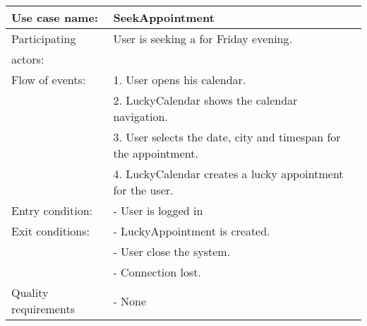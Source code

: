 {\tabulinesep=1.2mm
\begin{tabu}{ | p{3cm} | p{13cm} |}
    \hline
    Use case name: 			& 		SeekAppointment\\ \hline
    Participating  			& 		User is seeking a for Friday evening. \\
    actors:					&		\\ \hline
    Flow of events: 		& 		1. User opens his calendar. \\
							&		2. LuckyCalendar shows the calendar navigation.\\
							&		3. User selects the date, city and timespan for the appointment.\\
							&		4. LuckyCalendar creates a lucky appointment for the user.\\\hline
    Entry condition: 		& 		- User is logged in  \\ \hline
	Exit conditions: 		&		- LuckyAppointment is created.\\
							&		- User close the system.\\
							&		- Connection lost.\\\hline
	Quality requirements	&	 	- None \\\hline
\end{tabu}
}
